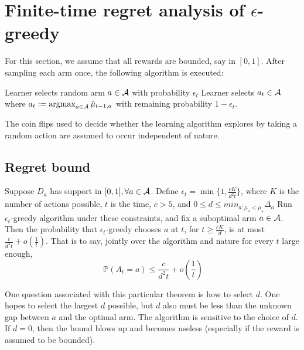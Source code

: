 \documentclass[11pt]{article}
\begin{document}
\section{Finite-time regret analysis of $\epsilon$-greedy}

For this section, we assume that all rewards are bounded, say in $[0,1]$.  After sampling each arm once, the following algorithm is executed:

\begin{algorithmic}[1]
\STATE Learner selects random arm $a \in \mathcal{A}$ with probability $\epsilon_{t}$
\STATE Learner selects $a_t \in \mathcal{A}$ where $a_t := \operatorname*{argmax}_{a \in \mathcal{A}} \hat{\mu}_{t-1, a}$ with remaining probability $1-\epsilon_{t}$.
\ENDFOR
\end{algorithmic}


The coin flips used to decide whether the learning algorithm explores by taking a random action are assumed to occur independent of nature.

\subsection{Regret bound}

\begin{theorem}
Suppose $D_a$ has support in $[0, 1], \forall a \in \mathcal{A}$.  Define $\epsilon_t = \min\{1, \frac{cK}{d^2t}\}$, where $K$ is the number of actions possible, $t$ is the time, $c > 5$, and $0 \le d \le min_{a:\mu_a < \mu_\star} \Delta_a$   Run $\epsilon_t$-greedy algorithm under these constraints, and fix a suboptimal arm $a \in \mathcal{A}$.  Then the probability that $\epsilon_t$-greedy chooses $a$ at $t$, for $t \ge \frac{cK}{d}$, is at most $\frac{c}{d^2t}+o(\frac{1}{t})$.  That is to say, jointly over the algorithm and nature for every $t$ large enough, 
\[
    \ \mathbb{P}(A_t = a) \le \frac{c}{d^2t} + o \left(\frac{1}{t} \right)
\]
\end{theorem}

One question associated with this particular theorem is how to select $d$.  One hopes to select the largest $d$ possible, but $d$ also must be less than the unknown gap between $a$ and the optimal arm.  
The algorithm is sensitive to the choice of $d$. If $d=0$, then the bound blows up and becomes useless (especially if the reward is assumed to be bounded).
\end{document}
